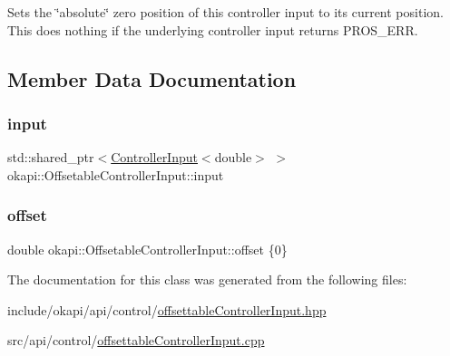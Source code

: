 Sets the \char`\"{}absolute\char`\"{} zero position of this controller input to its current position. This does nothing if the underlying controller input returns P\+R\+O\+S\+\_\+\+E\+RR. 

\subsection{Member Data Documentation}
\mbox{\label{classokapi_1_1OffsetableControllerInput_a3909fcdd8f3605a0620473ba2ee0eb09}} 
\subsubsection{\texorpdfstring{input}{input}}
{\footnotesize\ttfamily std\+::shared\+\_\+ptr$<$\mbox{\hyperlink{classokapi_1_1ControllerInput}{Controller\+Input}}$<$double$>$ $>$ okapi\+::\+Offsetable\+Controller\+Input\+::input\hspace{0.3cm}{\ttfamily [protected]}}

\mbox{\label{classokapi_1_1OffsetableControllerInput_a72b271a3893001de700d28256c5fbcd5}} 
\subsubsection{\texorpdfstring{offset}{offset}}
{\footnotesize\ttfamily double okapi\+::\+Offsetable\+Controller\+Input\+::offset \{0\}\hspace{0.3cm}{\ttfamily [protected]}}



The documentation for this class was generated from the following files\+:\begin{DoxyCompactItemize}
\item 
include/okapi/api/control/\mbox{\hyperlink{offsettableControllerInput_8hpp}{offsettable\+Controller\+Input.\+hpp}}\item 
src/api/control/\mbox{\hyperlink{offsettableControllerInput_8cpp}{offsettable\+Controller\+Input.\+cpp}}\end{DoxyCompactItemize}
